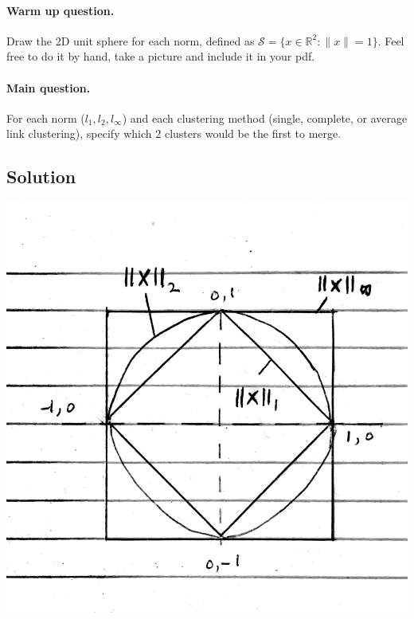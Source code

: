\documentclass[submit]{harvardml}
\begin{document}
\begin{problem}
  \paragraph{Warm up question.} \noindent Draw the 2D unit sphere for each norm,
  defined as $\mathcal{S} = \{x \in \mathbb{R}^2: \|x\| = 1 \}$. Feel free to do
  it by hand, take a picture and include it in your pdf.

  \paragraph{Main question.}
  \noindent For each norm ($l_1, l_2, l_\infty$) and each clustering method
  (single, complete, or average link clustering), specify which 2 clusters would
  be the first to merge.
\end{problem}

\subsection*{Solution}

\begin{center} \includegraphics[scale=.15]{norms.jpg} \end{center}
\end{document}

